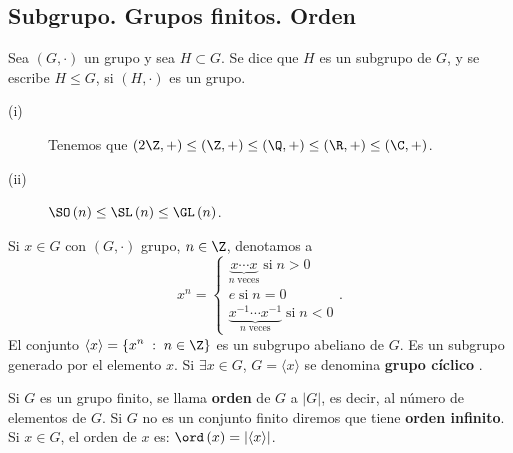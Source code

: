 \subsection{Subgrupo. Grupos finitos. Orden}

\begin{fdefinition}[]
\normalfont Sea $\displaystyle \left(G, \cdot\right) $ un grupo y sea $\displaystyle H\subset G $. Se dice que $\displaystyle H $ es un subgrupo de $\displaystyle G $, y se escribe $\displaystyle H \leq G $, si $\displaystyle \left(H, \cdot\right) $ es un grupo.
\end{fdefinition}

\begin{eg}
\normalfont 
\begin{description}
\item[(i)] Tenemos que $\displaystyle \left(2\Z, + \right) \leq \left(\Z, +\right) \leq \left(\Q, +\right) \leq \left(\R, +\right) \leq \left(\C, +\right) $. 
\item[(ii)] $\displaystyle \SO\left(n\right) \leq \SL\left(n\right) \leq \GL\left(n\right) $.
\end{description}
\end{eg}

\begin{fdefinition}[]
\normalfont Si $\displaystyle x \in G $ con $\displaystyle \left(G, \cdot \right) $ grupo, $\displaystyle n \in \Z $, denotamos a 
\[x^{n} =
\begin{cases}
	\underbrace{x \cdots x}_{n \; \text{veces}} \; \text{si} \; n > 0\\
	e \; \text{si} \; n = 0 \\
	\underbrace{x^{-1} \cdots x^{-1}}_{n \; \text{veces}} \; \text{si} \; n < 0
\end{cases}
.\]
El conjunto $\displaystyle \langle x \rangle = \left\{ x^{n} \; : \; n \in \Z\right\}  $ es un subgrupo abeliano de $\displaystyle G $. Es un subgrupo generado por el elemento $\displaystyle x $. Si $\displaystyle \exists x \in G $, $\displaystyle G = \langle x \rangle $ se denomina \textbf{grupo cíclico} . 
\end{fdefinition}

\begin{fdefinition}[Orden]
\normalfont Si $\displaystyle G $ es un grupo finito, se llama \textbf{orden} de $\displaystyle G $ a $\displaystyle \left|G\right| $, es decir, al número de elementos de $\displaystyle G $. Si $\displaystyle G $ no es un conjunto finito diremos que tiene \textbf{orden infinito}. Si $\displaystyle x \in G $, el orden de $\displaystyle x $ es: $\displaystyle \ord\left(x\right) = \left|\langle x \rangle\right| $.
\end{fdefinition}

